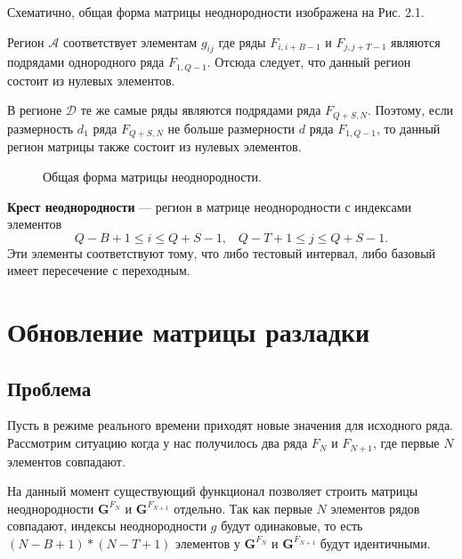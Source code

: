 \documentclass[specialist, substylefile = spbu.rtx,
			   subf, href, 12pt]{disser}
\begin{document}
Схематично, общая форма матрицы неоднородности изображена на Рис. 2.1. 

Регион $ \mathcal{A} $ соответствует элементам $ g_{ij} $ где ряды $ F_{i, i+B-1} $ и $ F_{j, j+T-1} $ являются подрядами однородного ряда $ F_{1,Q-1} $. Отсюда следует, что данный регион состоит из нулевых элементов. 

В регионе $ \mathcal{D} $ те же самые ряды являются подрядами ряда $ F_{Q+S,N} $. Поэтому, если размерность $ d_1 $ ряда $ F_{Q+S, N} $ не больше размерности $ d $ ряда $ F_{1, Q-1} $, то данный регион матрицы также состоит из нулевых элементов.


\begin{figure}[h]
	\caption{Общая форма матрицы неоднородности.}
\end{figure}

\textbf{Крест неоднородности} --- регион в матрице неоднородности с индексами элементов
$$Q-B+1 \leq i \leq Q+S-1, \;\;\; Q-T+1 \leq j \leq Q+S-1.$$
Эти элементы соответствуют тому, что либо тестовый интервал, либо базовый имеет пересечение с переходным.

\newpage
\chapter{Обновление матрицы разладки}
\section{Проблема}

Пусть в режиме реального времени приходят новые значения для исходного ряда. Рассмотрим ситуацию когда у нас получилось два ряда $F_N$ и $F_{N+1}$, где первые $N$ элементов совпадают.

На данный момент существующий функционал позволяет строить матрицы неоднородности $ \mathbf{G}^{F_N} $ и $ \mathbf{G}^{F_{N+1}} $ отдельно. Так как первые $N$ элементов рядов совпадают, индексы неоднородности $g$ будут одинаковые, то есть $(N - B + 1) * (N - T + 1)$ элементов у $ \mathbf{G}^{F_N} $ и $ \mathbf{G}^{F_{N+1}}$ будут идентичными. 
\end{document}
